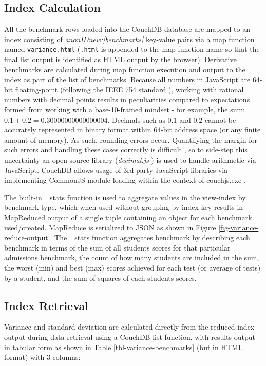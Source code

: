 \subsection{Index Calculation}
All the benchmark rows loaded into the CouchDB database are mapped to an index consisting of \textit{anonIDnew:[benchmarks]} key-value pairs via a map function named \texttt{variance.html} (\texttt{.html} is appended to the map function name so that the final list output is identified as HTML output by the browser). Derivative benchmarks are calculated during map function execution and output to the index as part of the list of benchmarks. Because all numbers in JavaScript are 64-bit floating-point (following the IEEE 754 standard \cite{floatingPoint}), working with rational numbers with decimal points results in peculiarities compared to expectations formed from working with a base-10-framed mindset - for example, the sum: $0.1 + 0.2 = 0.30000000000000004$. Decimals such as $0.1$ and $0.2$ cannot be accurately represented in binary format within 64-bit address space (or any finite amount of memory). As such, rounding errors occur. Quantifying the margin for such errors and handling these cases correctly is difficult \cite{Goldberg1991}, so to side-step this uncertainty an open-source library (\textit{decimal.js} \cite{decimaljs}) is used to handle arithmetic via JavaScript. CouchDB allows usage of 3rd party JavaScript libraries via implementing CommonJS module loading within the context of couchjs.exe \cite{commonJsMapFn}.

The built-in \_stats function is used to aggregate values in the view-index by benchmark type, which when used without grouping by index key results in MapReduced output of a single tuple containing an object for each benchmark used/created. MapReduce is serialized to JSON as shown in Figure \ref{fig-variance-reduce-output}. The \_stats function aggregates benchmark by describing each benchmark in terms of the sum of all students scores for that particular admissions benchmark, the count of how many students are included in the sum, the worst (min) and best (max) scores achieved for each test (or average of tests) by a student, and the sum of squares of each students scores.



\subsection{Index Retrieval}
Variance and standard deviation are calculated directly from the reduced index output during data retrieval using a CouchDB list function, with results output in tabular form as shown in Table \ref{tbl-variance-benchmarks} (but in HTML format) with 3 columns:


